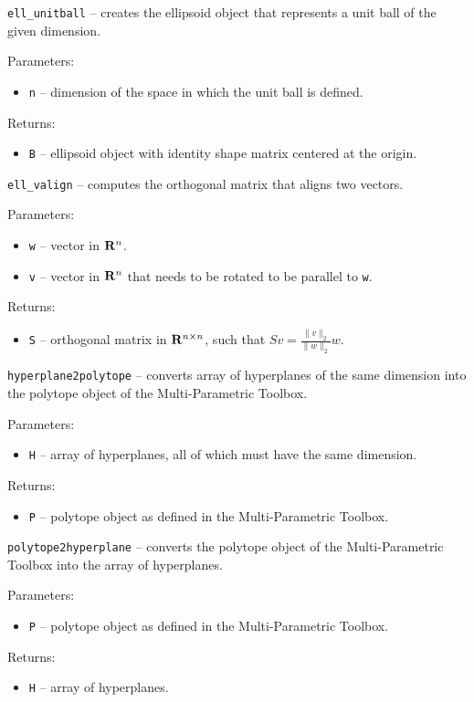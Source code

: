 \newpage

{\Large {\tt ell\_unitball}} -- creates the ellipsoid object that represents
a unit ball of the given dimension.

Parameters:
\begin{itemize}
\item {\tt n} -- dimension of the space in which the unit ball is defined.
\end{itemize}

Returns:
\begin{itemize}
\item {\tt B} -- ellipsoid object with identity shape matrix centered at the
origin.
\end{itemize}

\newpage

{\Large {\tt ell\_valign}} -- computes the orthogonal matrix that aligns two
vectors.

Parameters:
\begin{itemize}
\item {\tt w} -- vector in ${\bf R}^n$.
\item {\tt v} -- vector in ${\bf R}^n$ that needs to be rotated to be parallel
to {\tt w}.
\end{itemize}

Returns:
\begin{itemize}
\item {\tt S} -- orthogonal matrix in ${\bf R}^{n\times n}$, such that
$Sv = \frac{\|v\|_2}{\|w\|_2}w$.
\end{itemize}

\newpage

{\Large {\tt hyperplane2polytope}} -- converts array of hyperplanes of the
same dimension into the polytope object of the Multi-Parametric Toolbox.

Parameters:
\begin{itemize}
\item {\tt H} -- array of hyperplanes, all of which must have the same dimension.
\end{itemize}

Returns:
\begin{itemize}
\item {\tt P} -- polytope object as defined in the Multi-Parametric Toolbox.
\end{itemize}

\newpage

{\Large {\tt polytope2hyperplane}} -- converts the polytope object of the
Multi-Parametric Toolbox into the array of hyperplanes.

Parameters:
\begin{itemize}
\item {\tt P} -- polytope object as defined in the Multi-Parametric Toolbox.
\end{itemize}

Returns:
\begin{itemize}
\item {\tt H} -- array of hyperplanes.
\end{itemize}